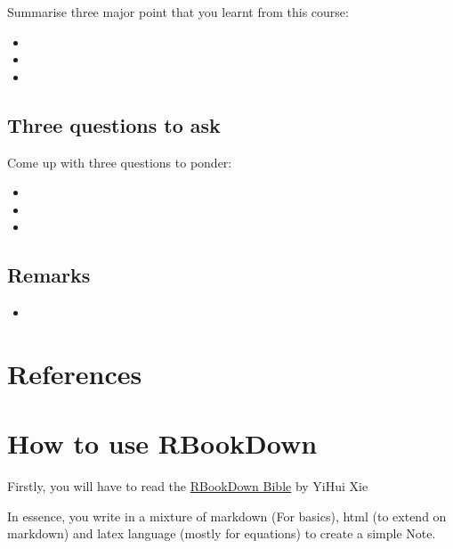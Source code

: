 \documentclass[
]{book}
\providecommand{\tightlist}{%
  \setlength{\itemsep}{0pt}\setlength{\parskip}{0pt}}
\begin{document}
Summarise three major point that you learnt from this course:

\begin{itemize}
\tightlist
\item
\item
\item
\end{itemize}

\hypertarget{three-questions-to-ask}{%
\section*{Three questions to ask}\label{three-questions-to-ask}}

Come up with three questions to ponder:

\begin{itemize}
\tightlist
\item
\item
\item
\end{itemize}

\hypertarget{remarks}{%
\section*{Remarks}\label{remarks}}

\begin{itemize}
\tightlist
\item
\end{itemize}

\hypertarget{references}{%
\chapter*{References}\label{references}}

\hypertarget{how-to-use-rbookdown}{%
\chapter*{How to use RBookDown}\label{how-to-use-rbookdown}}

Firstly, you will have to read the
\href{https://bookdown.org/yihui/bookdown/}{RBookDown Bible} by YiHui
Xie

In essence, you write in a mixture of markdown (For basics), html (to
extend on markdown) and latex language (mostly for equations) to create
a simple Note.
\end{document}

